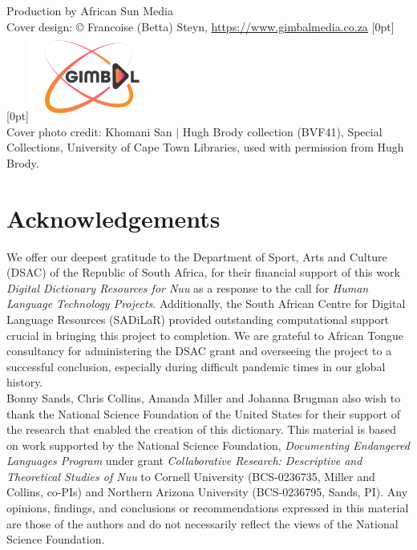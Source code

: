Production by African Sun Media\\[1em]

Cover design: \copyright{} Francoise (Betta) Steyn,
\url{https://www.gimbalmedia.co.za}\hspace{2cm}
\raisebox{-1em}[0pt][0pt]{\includegraphics[width=4cm]{gimbal.png}}
\\[1em]

Cover photo credit: \textipa{\textdoublebarpipe}Khomani San $|$ Hugh
Brody collection (BVF41), Special Collections, University of Cape Town
Libraries, used with permission from Hugh Brody.

\newpage
\thispagestyle{empty}

\renewcommand{\contentsname}{Inhoud/Contents}
\markboth{}{}
\tableofcontents
\markboth{}{}

\newpage

\thispagestyle{empty}


\markboth{}{}
\section*{Acknowledgements}
\markboth{}{}

We offer our deepest gratitude to the Department of Sport, Arts and
Culture (DSAC) of the Republic of South Africa, for their financial
support of this work \emph{Digital Dictionary Resources for
N\textipa{\textvertline}uu} as a response to the call for \emph{Human
Language Technology Projects}.  Additionally, the South African Centre
for Digital Language Resources (SADiLaR) provided outstanding
computational support crucial in bringing this project to completion.
We are grateful to African Tongue consultancy for administering the
DSAC grant and overseeing the project to a successful conclusion,
especially during difficult pandemic times in our global history.\\

Bonny Sands, Chris Collins, Amanda Miller and Johanna Brugman also
wish to thank the National Science Foundation of the United States for
their support of the research that enabled the creation of this
dictionary. This material is based on work supported by the National
Science Foundation, \emph{Documenting Endangered Languages Program}
under grant \emph{Collaborative Research: Descriptive and Theoretical
Studies of N\textipa{\textvertline}uu} to Cornell University
(BCS-0236735, Miller and Collins, co-PIs) and Northern Arizona
University (BCS-0236795, Sands, PI). Any opinions, findings, and
conclusions or recommendations expressed in this material are those of
the authors and do not necessarily reflect the views of the National
Science Foundation.\\

